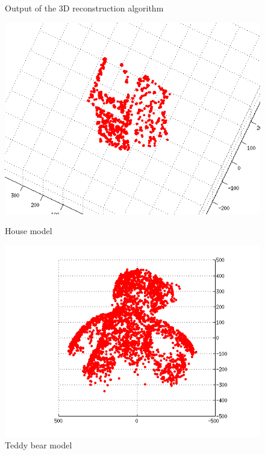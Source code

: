 \documentclass[a4paper,10pt]{article}
\begin{document}
\begin{figure}[ht]
\caption{Output of the 3D reconstruction algorithm}
\begin{minipage}[b]{0.45\linewidth}
\centering
\includegraphics[width=\textwidth]{cloud_house1}
\caption{House model}
\end{minipage}
\hspace{0.5cm}
\begin{minipage}[b]{0.45\linewidth}
\centering
\includegraphics[width=\textwidth]{cloud_teddy1}
\caption{Teddy bear model}
\end{minipage}
\label{fig:clouds}
\end{figure}
\end{document}
